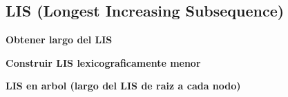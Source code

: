 \subsection{LIS (Longest Increasing Subsequence)}
    \textbf{Obtener largo del LIS}
    

    \textbf{Construir LIS lexicograficamente menor}
    

    \textbf{LIS en arbol (largo del LIS de raiz a cada nodo)}
    